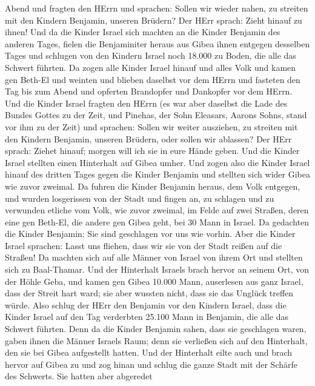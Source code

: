 Abend und fragten den HErrn und sprachen: Sollen wir wieder nahen, zu
streiten mit den Kindern Benjamin, unseren Brüdern? Der HErr sprach:
Zieht hinauf zu ihnen!  Und da die Kinder Israel sich
machten an die Kinder Benjamin des anderen Tages,  fielen
die Benjaminiter heraus aus Gibea ihnen entgegen desselben Tages und
schlugen von den Kindern Israel noch 18.000 zu Boden, die alle das
Schwert führten.  Da zogen alle Kinder Israel hinauf und
alles Volk und kamen gen Beth-El und weinten und blieben daselbst vor
dem HErrn und fasteten den Tag bis zum Abend und opferten Brandopfer und
Dankopfer vor dem HErrn.  Und die Kinder Israel fragten den
HErrn (es war aber daselbst die Lade des Bundes Gottes zu der Zeit,
 und Pinehas, der Sohn Eleasars, Aarons Sohns, stand vor
ihm zu der Zeit) und sprachen: Sollen wir weiter ausziehen, zu streiten
mit den Kindern Benjamin, unseren Brüdern, oder sollen wir ablassen? Der
HErr sprach: Ziehet hinauf; morgen will ich sie in eure Hände geben.
 Und die Kinder Israel stellten einen Hinterhalt auf Gibea
umher.  Und zogen also die Kinder Israel hinauf des dritten
Tages gegen die Kinder Benjamin und stellten sich wider Gibea wie zuvor
zweimal.  Da fuhren die Kinder Benjamin heraus, dem Volk
entgegen, und wurden losgerissen von der Stadt und fingen an, zu
schlagen und zu verwunden etliche vom Volk, wie zuvor zweimal, im Felde
auf zwei Straßen, deren eine gen Beth-El, die andere gen Gibea geht, bei
30 Mann in Israel.  Da gedachten die Kinder Benjamin: Sie
sind geschlagen vor uns wie vorhin. Aber die Kinder Israel sprachen:
Lasst uns fliehen, dass wir sie von der Stadt reißen auf die Straßen!
 Da machten sich auf alle Männer von Israel von ihrem Ort
und stellten sich zu Baal-Thamar. Und der Hinterhalt Israels brach
hervor an seinem Ort, von der Höhle Geba,  und kamen gen
Gibea 10.000 Mann, auserlesen aus ganz Israel, dass der Streit hart
ward; sie aber wussten nicht, dass sie das Unglück treffen würde.
 Also schlug der HErr den Benjamin vor den Kindern Israel,
dass die Kinder Israel auf den Tag verderbten 25.100 Mann in Benjamin,
die alle das Schwert führten.  Denn da die Kinder Benjamin
sahen, dass sie geschlagen waren, gaben ihnen die Männer Israels Raum;
denn sie verließen sich auf den Hinterhalt, den sie bei Gibea
aufgestellt hatten.  Und der Hinterhalt eilte auch und
brach hervor auf Gibea zu und zog hinan und schlug die ganze Stadt mit
der Schärfe des Schwerts.  Sie hatten aber abgeredet
